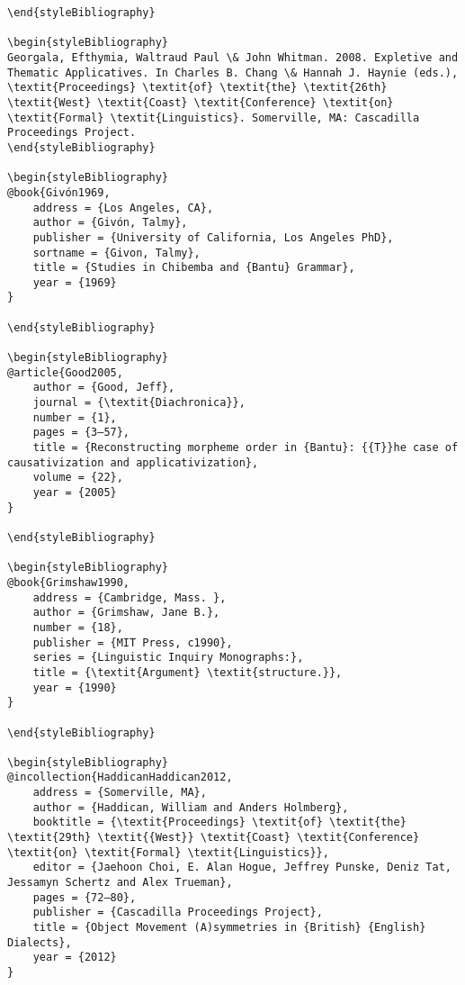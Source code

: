 \documentclass[output=paper,modfonts,nonflat]{langsci/langscibook}
\begin{document}
\begin{verbatim}
\end{styleBibliography}

\begin{styleBibliography}
Georgala, Efthymia, Waltraud Paul \& John Whitman. 2008. Expletive and Thematic Applicatives. In Charles B. Chang \& Hannah J. Haynie (eds.), \textit{Proceedings} \textit{of} \textit{the} \textit{26th} \textit{West} \textit{Coast} \textit{Conference} \textit{on} \textit{Formal} \textit{Linguistics}. Somerville, MA: Cascadilla Proceedings Project.
\end{styleBibliography}

\begin{styleBibliography}
@book{Givón1969,
	address = {Los Angeles, CA},
	author = {Givón, Talmy},
	publisher = {University of California, Los Angeles PhD},
	sortname = {Givon, Talmy},
	title = {Studies in Chibemba and {Bantu} Grammar},
	year = {1969}
}

\end{styleBibliography}

\begin{styleBibliography}
@article{Good2005,
	author = {Good, Jeff},
	journal = {\textit{Diachronica}},
	number = {1},
	pages = {3–57},
	title = {Reconstructing morpheme order in {Bantu}: {{T}}he case of causativization and applicativization},
	volume = {22},
	year = {2005}
}

\end{styleBibliography}

\begin{styleBibliography}
@book{Grimshaw1990,
	address = {Cambridge, Mass. },
	author = {Grimshaw, Jane B.},
	number = {18},
	publisher = {MIT Press, c1990},
	series = {Linguistic Inquiry Monographs:},
	title = {\textit{Argument} \textit{structure.}},
	year = {1990}
}

\end{styleBibliography}

\begin{styleBibliography}
@incollection{HaddicanHaddican2012,
	address = {Somerville, MA},
	author = {Haddican, William and Anders Holmberg},
	booktitle = {\textit{Proceedings} \textit{of} \textit{the} \textit{29th} \textit{{West}} \textit{Coast} \textit{Conference} \textit{on} \textit{Formal} \textit{Linguistics}},
	editor = {Jaehoon Choi, E. Alan Hogue, Jeffrey Punske, Deniz Tat, Jessamyn Schertz and Alex Trueman},
	pages = {72–80},
	publisher = {Cascadilla Proceedings Project},
	title = {Object Movement (A)symmetries in {British} {English} Dialects},
	year = {2012}
}


\end{verbatim}
\end{document}
